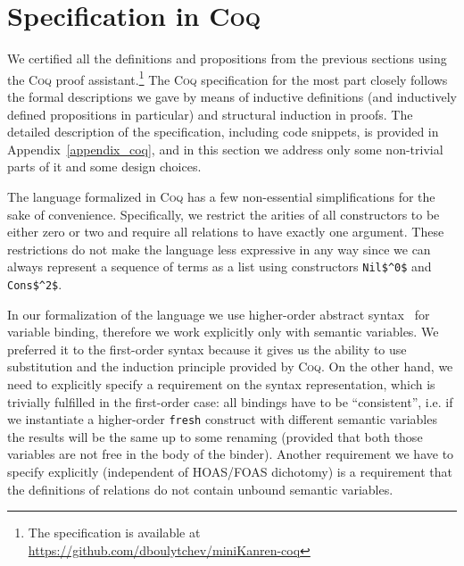 \section{Specification in \textsc{Coq}}
\label{specification}

We certified all the definitions and propositions from the previous sections using the \textsc{Coq} proof assistant.\footnote{The specification is available at \url{https://github.com/dboulytchev/miniKanren-coq}} The \textsc{Coq} specification for the most part closely follows the formal descriptions we gave by means of inductive definitions (and inductively defined propositions in particular) and structural induction in proofs. The detailed description of the specification, including code snippets, is provided in Appendix~\ref{appendix_coq}, and in this section we address only some non-trivial parts of it and some design choices.

The language formalized in \textsc{Coq} has a few non-essential simplifications for the sake of convenience. Specifically, we restrict the arities of all constructors to be either zero or two and require all relations to have exactly one argument. These restrictions do not make the language less expressive in any way since we can always represent a sequence of terms as a list using constructors \lstinline|Nil$^0$| and \lstinline|Cons$^2$|. 

In our formalization of the language we use higher-order abstract syntax~\cite{HOAS} for variable binding, therefore we work explicitly only with semantic variables. We preferred it to the first-order syntax because it gives us the ability to use substitution and the induction principle provided by \textsc{Coq}. On the other hand, we need to explicitly specify a requirement on the syntax representation, which is trivially fulfilled in the first-order case: all bindings have to be ``consistent'', i.e. if we instantiate a higher-order \lstinline|fresh| construct with different semantic variables the results will be the same up to some renaming (provided that both those variables are not free in the body of the binder). Another requirement we have to specify explicitly (independent of HOAS/FOAS dichotomy) is a requirement that the definitions of relations do not contain unbound semantic variables.

